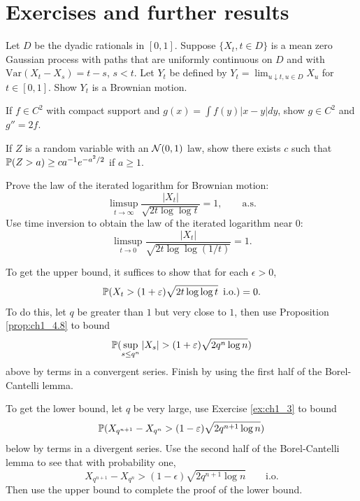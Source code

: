 \section{Exercises and further results}\label{ch1_sec8}

\begin{exercise}\label{ex:ch1_1}
Let $D$ be the dyadic rationals in $[0,1]$. Suppose $\{X_t, t \in D\}$ is a mean zero Gaussian process with paths that are uniformly continuous on $D$ and with $\text{Var}(X_t - X_s) = t-s$, $s < t$. Let $Y_t$ be defined by $Y_t = \lim_{u\downarrow t,u\in D} X_u$ for $t \in [0,1]$. Show $Y_t$ is a Brownian motion.
\end{exercise}

\begin{exercise}\label{ex:ch1_2}
If $f \in C^2$ with compact support and $g(x) = \int f(y)|x-y|dy$, show $g \in C^2$ and $g'' = 2f$.
\end{exercise}

\begin{exercise}\label{ex:ch1_3}
If $Z$ is a random variable with an $\NC(0,1)$ law, show there exists $c$ such that $\P(Z > a) \geq ca^{-1}e^{-a^2/2}$ if $a \geq 1$.
\end{exercise}

\begin{exercise}\label{ex:ch1_4}
Prove the law of the iterated logarithm for Brownian motion:
\mpagebreak
\[
    \limsup_{t\to\infty} \frac{|X_t|}{\sqrt{2t\log\log t}} = 1, \qquad \text{a.s.}
\]
Use time inversion to obtain the law of the iterated logarithm near $0$:
\[
    \limsup_{t\to 0} \frac{|X_t|}{\sqrt{2t\log\log(1/t)}} = 1.
\]

\hint To get the upper bound, it suffices to show that for each $\epsilon > 0$,
\[
    \P(X_t > (1+\epsilon)\sqrt{2t\log\log t}\,~\text{i.o.}) = 0.
\]
To do this, let $q$ be greater than $1$ but very close to $1$, then use Proposition \ref{prop:ch1_4.8} to bound
\[
    \P(\sup_{s\leq q^n} |X_s| > (1+\epsilon)\sqrt{2q^n\log n})
\]
above by terms in a convergent series. Finish by using the first half of the Borel-Cantelli lemma.

To get the lower bound, let $q$ be very large, use Exercise \ref{ex:ch1_3} to bound
\[
    \P(X_{q^{n+1}} - X_{q^n} > (1-\epsilon)\sqrt{2q^{n+1}\log n})
\]
below by terms in a divergent series. Use the second half of the Borel-Cantelli lemma to see that with probability one,
\[
    X_{q^{n+1}} - X_{q^n} > (1-\epsilon)\sqrt{2q^{n+1}\log n} \qquad \text{i.o.}
\]
Then use the upper bound to complete the proof of the lower bound.
\end{exercise}

